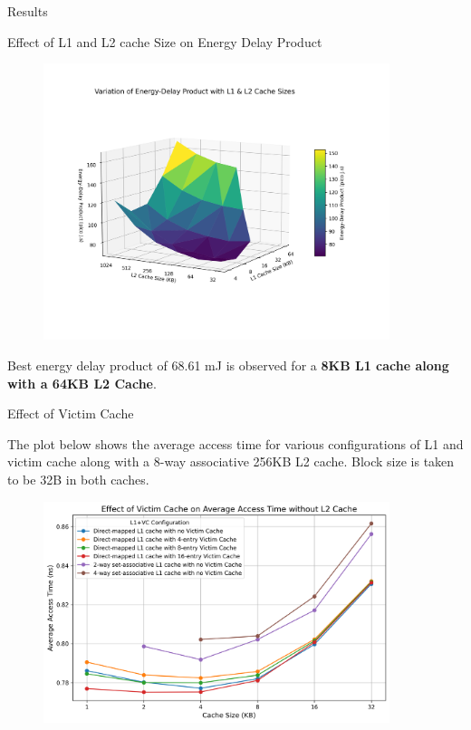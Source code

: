 \begin{section}{Results}
\begin{subsection}{Effect of L1 and L2 cache Size on Energy Delay Product}
        \begin{figure}[h!]
            \includegraphics[width=0.9\textwidth]{figures/fig6/fig6.png}
            \centering
            \label{fig:fig6}
        \end{figure}
    
        Best energy delay product of 68.61 mJ is observed for a \textbf{8KB L1 cache along with a 64KB L2 Cache}.
        
    \end{subsection}
   
    \begin{subsection}{Effect of Victim Cache}

        The plot below shows the average access time for various configurations of L1 and victim cache along with a 8-way associative 256KB L2 cache. Block size is taken to be 32B in both caches.

        \begin{figure}[h!]
            \includegraphics[width=0.9\textwidth]{figures/fig7/fig7.png}
            \centering
            \label{fig:fig7}
        \end{figure}


\end{subsection}
\end{section}
